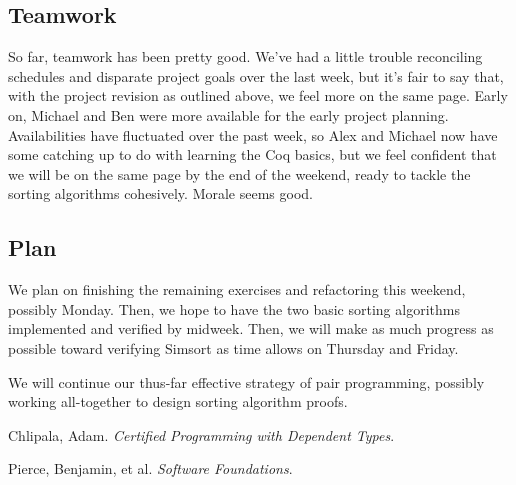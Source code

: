 \documentclass{article}
\begin{document}
\subsection{Teamwork}
  So far, teamwork has been pretty good. We've had a little trouble reconciling
  schedules and disparate project goals over the last week, but it's fair to
  say that, with the project revision as outlined above, we feel more on the
  same page. Early on, Michael and Ben were more available for the early project
  planning. Availabilities have fluctuated over the past week, so Alex and
  Michael now have some catching up to do with learning the Coq basics,
  but we feel confident that we will be on the same page by the end of the
  weekend, ready to tackle the sorting algorithms cohesively.
  Morale seems good.
\subsection{Plan}
  We plan on finishing the remaining exercises and refactoring this weekend,
  possibly Monday.
  Then, we hope to have the two basic sorting algorithms implemented and verified
  by midweek.
  Then, we will make as much progress as possible toward verifying Simsort
  as time allows on Thursday and Friday.

  We will continue our thus-far effective strategy of pair programming,
  possibly working all-together to design sorting algorithm proofs.


\begin{thebibliography}{xx}
    Chlipala, Adam. \emph{Certified Programming with Dependent Types}.

    Pierce, Benjamin, et al. \emph{Software Foundations}.

\end{thebibliography}
\end{document}
